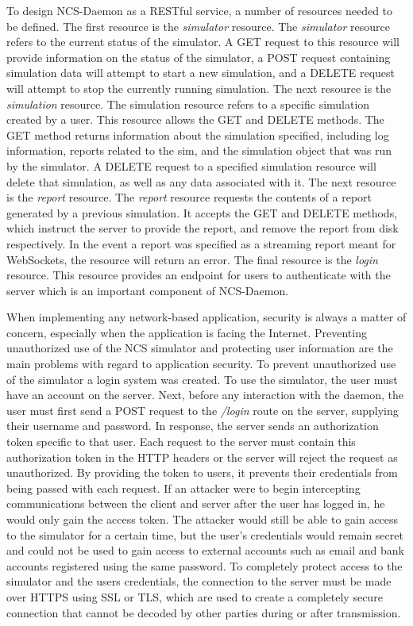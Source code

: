 To design NCS-Daemon as a RESTful service, a number of resources needed to be defined. The first resource is the \emph{simulator} resource. The \emph{simulator} resource refers to the current status of the simulator. A GET request to this resource will provide information on the status of the simulator, a POST request containing simulation data will attempt to start a new simulation, and a DELETE request will attempt to stop the currently running simulation. The next resource is the \emph{simulation} resource. The simulation resource refers to a specific simulation created by a user. This resource allows the GET and DELETE methods. The GET method returns information about the simulation specified, including log information, reports related to the sim, and the simulation object that was run by the simulator. A DELETE request to a specified simulation resource will delete that simulation, as well as any data associated with it. The next resource is the \emph{report} resource. The \emph{report} resource requests the contents of a report generated by a previous simulation. It accepts the GET and DELETE methods, which instruct the server to provide the report, and remove the report from disk respectively. In the event a report was specified as a streaming report meant for WebSockets, the resource will return an error. The final resource is the \emph{login} resource. This resource provides an endpoint for users to authenticate with the server which is an important component of NCS-Daemon.

When implementing any network-based application, security is always a matter of concern, especially when the application is facing the Internet. Preventing unauthorized use of the NCS simulator and protecting user information are the main problems with regard to application security. To prevent unauthorized use of the simulator a login system was created. To use the simulator, the user must have an account on the server. Next, before any interaction with the daemon, the user must first send a POST request to the \emph{/login} route on the server, supplying their username and password. In response, the server sends an authorization token specific to that user. Each request to the server must contain this authorization token in the HTTP headers or the server will reject the request as unauthorized. By providing the token to users, it prevents their credentials from being passed with each request. If an attacker were to begin intercepting communications between the client and server after the user has logged in, he would only gain the access token. The attacker would still be able to gain access to the simulator for a certain time, but the user's credentials would remain secret and could not be used to gain access to external accounts such as email and bank accounts registered using the same password. To completely protect access to the simulator and the users credentials, the connection to the server must be made over HTTPS using SSL or TLS, which are used to create a completely secure connection that cannot be decoded by other parties during or after transmission.

